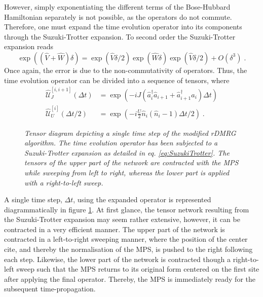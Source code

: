 However, simply exponentiating the different terms of the Bose-Hubbard Hamiltonian separately is not possible, as the operators do not commute. Therefore, one must expand the time evolution operator into its components through the Suzuki-Trotter expansion. To second order the Suzuki-Trotter expansion reads
\begin{equation}
	\exp\left(  ( \hat{V} + \hat{W}  ) \delta \right) = \exp\left(  \hat{V} \delta /2  \right) \exp\left(  \hat{W} \delta   \right) \exp\left(  \hat{V} \delta /2  \right) + O(\delta^3) \; . \label{eq:SuzukiTrotter}
\end{equation}
Once again, the error is due to the non-commutativity of operators. Thus, the time evolution operator can be divided into a sequence of tensors, where
\begin{align}
	\hat{\mathcal{U}}_{J}^{[i,i+1]} (\Delta t) &= \exp \left( -i J ( \hat{a}_{i}^{\dag} \hat{a}_{i+1} + \hat{a}_{i+1}^{\dag} \hat{a}_{i} ) \Delta t \right) \\
	\hat{\mathcal{U}}_{U}^{[i]} (\Delta t /2) &= \exp \left( -i \frac{U}{2} \hat{n}_i (\hat{n}_i -1) \Delta t /2 \right) \; .
\end{align}
\begin{figure}[h!]
	\centering
	
	\caption{\textit{Tensor diagram depicting a single time step of the modified rDMRG algorithm. The time evolution operator has been subjected to a Suzuki-Trotter expansion as detailed in eq. \eqref{eq:SuzukiTrotter}. The tensors of the upper part of the network are contracted with the MPS while sweeping from left to right, whereas the lower part is applied with a right-to-left sweep.}}
	\label{fig:ModifiedTEBD}
\end{figure}
A single time step, $\Delta t$, using the expanded operator is represented diagrammatically in figure \ref{fig:ModifiedTEBD}. At first glance, the tensor network resulting from the Suzuki-Trotter expansion may seem rather extensive, however, it can be contracted in a very efficient manner. The upper part of the network is contracted in a left-to-right sweeping manner, where the position of the center cite, and thereby the normalisation of the MPS, is pushed to the right following each step. Likewise, the lower part of the network is contracted though a right-to-left sweep such that the MPS returns to its original form centered on the first site after applying the final operator. Thereby, the MPS is immediately ready for the subsequent time-propagation.\\
